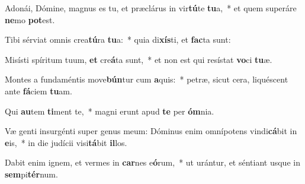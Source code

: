 \item Adonái, Dómine, magnus es tu, et præclárus in vir\textbf{tú}te \textbf{tu}a,~* et quem superáre \textbf{ne}mo \textbf{pot}est.
\item Tibi sérviat omnis crea\textbf{tú}ra \textbf{tu}a:~* quia di\textbf{xís}ti, et \textbf{fac}ta sunt:
\item Misísti spíritum tuum, \textbf{et} cre\textbf{á}ta sunt,~* et non est qui resístat \textbf{vo}ci \textbf{tu}æ.
\item Montes a fundaméntis move\textbf{bún}tur cum \textbf{a}quis:~* petræ, sicut cera, liquéscent ante \textbf{fá}ciem \textbf{tu}am.
\item Qui \textbf{au}tem \textbf{ti}ment te,~* magni erunt apud \textbf{te} per \textbf{óm}nia.
\item Væ genti insurgénti super genus meum: Dóminus enim omnípotens vindi\textbf{cá}bit in \textbf{e}is,~* in die judícii visi\textbf{tá}bit \textbf{il}los.
\item Dabit enim ignem, et vermes in \textbf{car}nes e\textbf{ó}rum,~* ut urántur, et séntiant usque in \textbf{sem}pi\textbf{tér}num.
